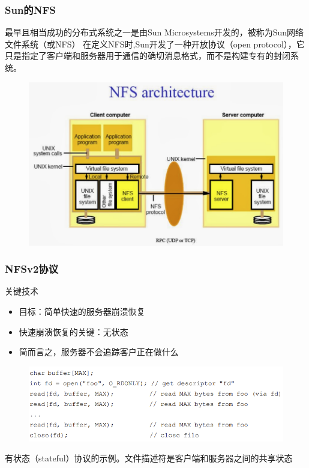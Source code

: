 \begin{frame}[fragile]
    \frametitle{Sun的NFS}
    最早且相当成功的分布式系统之一是由Sun Microsystems开发的，被称为Sun网络文件系统（或NFS）
    \pause
    在定义NFS时,Sun开发了一种开放协议（open protocol），它只是指定了客户端和服务器用于通信的确切消息格式，而不是构建专有的封闭系统。
        \begin{figure}
            \includegraphics[width=0.5\linewidth]{figs/sun-nfs.png}
        \end{figure}
\end{frame}
\begin{frame}[fragile]
    \frametitle{NFSv2协议}
关键技术
    \begin{itemize}
        \item 目标：简单快速的服务器崩溃恢复\pause
        \item 快速崩溃恢复的关键：无状态
        \item 简而言之，服务器不会追踪客户正在做什么
    \end{itemize}
    \begin{figure}
    \includegraphics[width=0.8\linewidth]{figs/stateful-code.png}
    \end{figure}
有状态（stateful）协议的示例。文件描述符是客户端和服务器之间的共享状态 
\end{frame}


